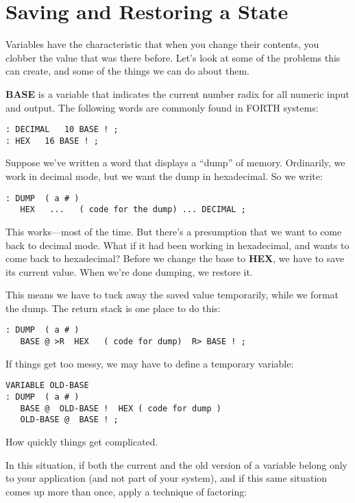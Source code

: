 \section{Saving and Restoring a State}

Variables have the characteristic that when you change their contents,
you clobber the value that was there before. Let's look at some of the
problems this can create, and some of the things we can do about them.

\textbf{BASE} is a variable that indicates the current number radix for all
numeric input and output. The following words are commonly found in
FORTH systems:

\begin{verbatim}
: DECIMAL   10 BASE ! ;
: HEX   16 BASE ! ;
\end{verbatim}

Suppose we've written a word that displays a ``dump'' of memory. Ordinarily,
we work in decimal mode, but we want the dump in hexadecimal. So we write:

\begin{verbatim}
: DUMP  ( a # )
   HEX   ...   ( code for the dump) ... DECIMAL ;
\end{verbatim}

This works---most of the time. But there's a presumption that we want to
come back to decimal mode. What if it had been working in hexadecimal,
and wants to come back to hexadecimal? Before we change the base to
\textbf{HEX}, we have to save its current value. When we're done dumping, we
restore it.

This means we have to tuck away the saved value temporarily,
while we format the dump. The return stack is one place to do this:

\begin{verbatim}
: DUMP  ( a # )
   BASE @ >R  HEX   ( code for dump)  R> BASE ! ;
\end{verbatim}

If things get too messy, we may have to define a temporary variable:

\begin{verbatim}
VARIABLE OLD-BASE
: DUMP  ( a # )
   BASE @  OLD-BASE !  HEX ( code for dump )
   OLD-BASE @  BASE ! ;
\end{verbatim}

How quickly things get complicated.

In this situation, if both the current and the old version of a variable
belong only to your application (and not part of your system), and if this
same situation comes up more than once, apply a technique of factoring:

